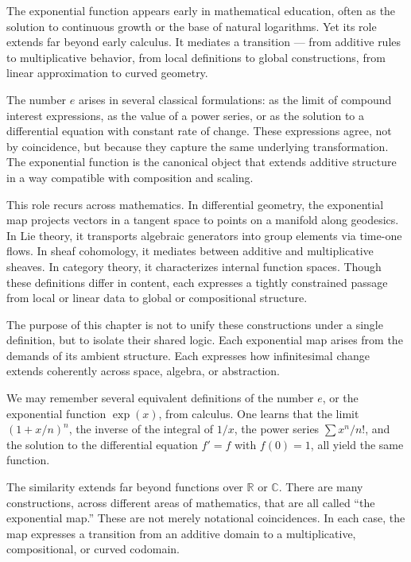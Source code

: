 The exponential function appears early in mathematical education, often as the solution to continuous growth or the base of natural logarithms. Yet its role extends far beyond early calculus. It mediates a transition — from additive rules to multiplicative behavior, from local definitions to global constructions, from linear approximation to curved geometry.

The number \( e \) arises in several classical formulations: as the limit of compound interest expressions, as the value of a power series, or as the solution to a differential equation with constant rate of change. These expressions agree, not by coincidence, but because they capture the same underlying transformation. The exponential function is the canonical object that extends additive structure in a way compatible with composition and scaling.

This role recurs across mathematics. In differential geometry, the exponential map projects vectors in a tangent space to points on a manifold along geodesics. In Lie theory, it transports algebraic generators into group elements via time-one flows. In sheaf cohomology, it mediates between additive and multiplicative sheaves. In category theory, it characterizes internal function spaces. Though these definitions differ in content, each expresses a tightly constrained passage from local or linear data to global or compositional structure.

The purpose of this chapter is not to unify these constructions under a single definition, but to isolate their shared logic. Each exponential map arises from the demands of its ambient structure. Each expresses how infinitesimal change extends coherently across space, algebra, or abstraction.

We may remember several equivalent definitions of the number \( e \), or the exponential function \( \exp(x) \), from calculus. One learns that the limit $\left(1 + x/n\right)^n$,
the inverse of the integral of \( 1/x \), the power series \( \sum x^n/n! \), and the solution to the differential equation \( f' = f \) with \( f(0) = 1 \), all yield the same function.

The similarity extends far beyond functions over \( \mathbb{R} \) or \( \mathbb{C} \). There are many constructions, across different areas of mathematics, that are all called “the exponential map.” These are not merely notational coincidences. In each case, the map expresses a transition from an additive domain to a multiplicative, compositional, or curved codomain.

